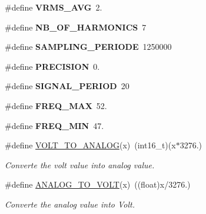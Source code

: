 \begin{DoxyCompactItemize}
\item 
\hypertarget{group___requirements__module_ga8c26a158c7a7c4284bd7fddbff675281}{}\#define {\bfseries V\+R\+M\+S\+\_\+\+A\+V\+G}~2.\label{group___requirements__module_ga8c26a158c7a7c4284bd7fddbff675281}

\item 
\hypertarget{group___requirements__module_gaf19145a1562f904bf1d7476520429c2f}{}\#define {\bfseries N\+B\+\_\+\+O\+F\+\_\+\+H\+A\+R\+M\+O\+N\+I\+C\+S}~7\label{group___requirements__module_gaf19145a1562f904bf1d7476520429c2f}

\item 
\hypertarget{group___requirements__module_ga2a436b428bcd484618299f245c049b87}{}\#define {\bfseries S\+A\+M\+P\+L\+I\+N\+G\+\_\+\+P\+E\+R\+I\+O\+D\+E}~1250000\label{group___requirements__module_ga2a436b428bcd484618299f245c049b87}

\item 
\hypertarget{group___requirements__module_ga9c7b069fee3c8184e14a7de8e5da2dc6}{}\#define {\bfseries P\+R\+E\+C\+I\+S\+I\+O\+N}~0.\label{group___requirements__module_ga9c7b069fee3c8184e14a7de8e5da2dc6}

\item 
\hypertarget{group___requirements__module_gafc21f6d55c7f41013c70d2d755a1a783}{}\#define {\bfseries S\+I\+G\+N\+A\+L\+\_\+\+P\+E\+R\+I\+O\+D}~20\label{group___requirements__module_gafc21f6d55c7f41013c70d2d755a1a783}

\item 
\hypertarget{group___requirements__module_ga94163a2b46e66d27bede4639532eed5c}{}\#define {\bfseries F\+R\+E\+Q\+\_\+\+M\+A\+X}~52.\label{group___requirements__module_ga94163a2b46e66d27bede4639532eed5c}

\item 
\hypertarget{group___requirements__module_gad54409ee4e2e0cf2479829515bdcbe29}{}\#define {\bfseries F\+R\+E\+Q\+\_\+\+M\+I\+N}~47.\label{group___requirements__module_gad54409ee4e2e0cf2479829515bdcbe29}

\item 
\#define \hyperlink{group___requirements__module_gad4b2cd4a4d9794ab6b274b7b7cb49b87}{V\+O\+L\+T\+\_\+\+T\+O\+\_\+\+A\+N\+A\+L\+O\+G}(x)~(int16\+\_\+t)(x$\ast$3276.)
\begin{DoxyCompactList}\small\item\em Converte the volt value into analog value. \end{DoxyCompactList}\item 
\#define \hyperlink{group___requirements__module_ga008847cd913682f8028af0e5e5c68888}{A\+N\+A\+L\+O\+G\+\_\+\+T\+O\+\_\+\+V\+O\+L\+T}(x)~((float)x/3276.)
\begin{DoxyCompactList}\small\item\em Converte the analog value into Volt. \end{DoxyCompactList}\end{DoxyCompactItemize}


